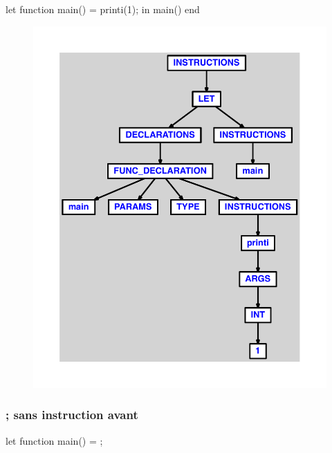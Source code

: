 \documentclass{article}
\begin{document}
\begin{verbatimtab}
let function main() = printi(1); in main() end
\end{verbatimtab}
\begin{figure}[H]\centering\includegraphics[max width=\textwidth]{ast/ast_37.pdf}\end{figure}\subsubsection{; sans instruction avant}
\begin{verbatimtab}
let function main() = ;
\end{verbatimtab}
\end{document}
